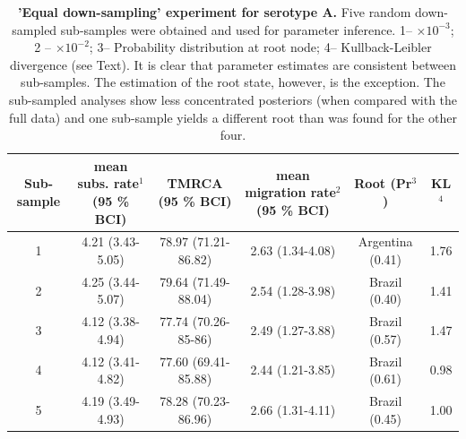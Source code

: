 \documentclass[a4paper,10pt]{article}
\begin{document}
\newpage
\begin{table}
\medskip
\begin{minipage}{\textwidth} 
\begin{center}
\caption{ {{\bf 'Equal down-sampling' experiment for serotype A.}} 
Five random down-sampled sub-samples were obtained and used for parameter inference.
1-- $\times 10^{-3}$; 2 -- $\times 10^{-2}$; 3-- Probability distribution at root node; 4-- Kullback-Leibler divergence (see Text).
It is clear that parameter estimates are consistent between sub-samples.
The estimation of the root state, however, is the exception.
The sub-sampled analyses show less concentrated posteriors (when compared with the full data) and one sub-sample yields a different root than was found for the other four. 
}
\begin{tabular}{cccccc}
\toprule
Sub-sample	&mean subs. rate$^{1}$ (95 \% BCI)	&TMRCA (95 \% BCI)	&mean migration rate$^{2}$  (95 \% BCI)	&Root (Pr$^{3}$)& KL$^4$\\
\midrule
1	&4.21 (3.43-5.05)	&78.97 (71.21-86.82)	&2.63 (1.34-4.08)	&Argentina (0.41)& 1.76\\
2	&4.25 (3.44-5.07)	&79.64 (71.49-88.04)	&2.54 (1.28-3.98)	&Brazil (0.40)& 1.41\\
3	&4.12 (3.38-4.94)	&77.74 (70.26-85-86)	&2.49 (1.27-3.88)	&Brazil (0.57)&1.47\\
4	&4.12 (3.41-4.82)	&77.60 (69.41-85.88)	&2.44 (1.21-3.85)	&Brazil (0.61)&0.98\\
5	&4.19 (3.49-4.93)	&78.28 (70.23-86.96)	&2.66 (1.31-4.11)	&Brazil (0.45)& 1.00\\
\bottomrule
\end{tabular}
\label{stab:ED_A}
\end{center}
\end{minipage}
\end{table}
\end{document}
